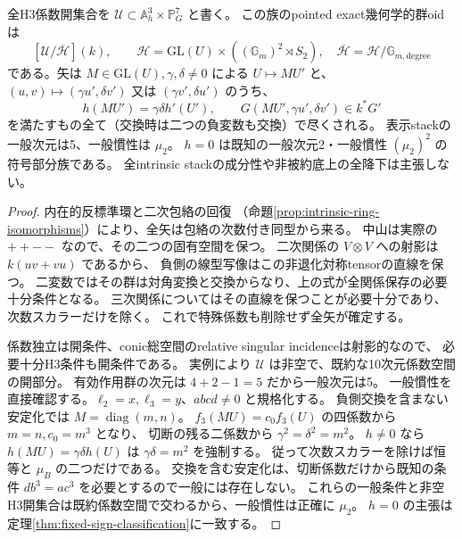 \begin{theorem}[曲がったClifford族の全幾何学的矢]
\label{thm:h3-order2-22-clifford-arrows}
全H3係数開集合を
$\mathcal U\subset\mathbb A^3_h\times\mathbb P^7_G$ と書く。
この族のpointed exact幾何学的群oidは
\[
 [\mathcal U/\overline{\mathcal H}](k),\qquad
 \mathcal H=\mathrm{GL}(U)\times((\mathbb G_m)^2\rtimes S_2),\quad
 \overline{\mathcal H}=\mathcal H/\mathbb G_{m,\mathrm{degree}}
\]
である。矢は $M\in\mathrm{GL}(U),\gamma,\delta\ne0$ による
$U\mapsto MU'$ と、
$(u,v)\mapsto(\gamma u',\delta v')$ 又は
$(\gamma v',\delta u')$ のうち、
\[
 h(MU')=\gamma\delta h'(U'),\qquad G(MU',\gamma u',\delta v')\in k^*G'
\]
を満たすもの全て（交換時は二つの負変数も交換）で尽くされる。
表示stackの一般次元は5、一般慣性は $\mu_2$。
$h=0$ は既知の一般次元2・一般慣性 $(\mu_2)^2$ の符号部分族である。
全intrinsic stackの成分性や非被約底上の全降下は主張しない。
\end{theorem}
\begin{proof}
内在的反標準環と二次包絡の回復
（命題\ref{prop:intrinsic-ring-isomorphisms}）により、全矢は包絡の次数付き同型から来る。
中山は実際の $++--$ なので、その二つの固有空間を保つ。
二次関係の $V\otimes V$ への射影は $k(uv+vu)$ であるから、
負側の線型写像はこの非退化対称tensorの直線を保つ。
二変数ではその群は対角変換と交換からなり、上の式が全関係保存の必要十分条件となる。
三次関係についてはその直線を保つことが必要十分であり、次数スカラーだけを除く。
これで特殊係数も削除せず全矢が確定する。

係数独立は開条件、conic総空間のrelative singular incidenceは射影的なので、
必要十分H3条件も開条件である。
実例により $\mathcal U$ は非空で、既約な10次元係数空間の開部分。
有効作用群の次元は $4+2-1=5$ だから一般次元は5。
一般慣性を直接確認する。$\ell_2=x,\ell_3=y$、$abcd\ne0$ と規格化する。
負側交換を含まない安定化では $M=\operatorname{diag}(m,n)$。
$f_3(MU)=c_0f_3(U)$ の四係数から $m=n,c_0=m^3$ となり、
切断の残る二係数から $\gamma^2=\delta^2=m^2$。
$h\ne0$ なら $h(MU)=\gamma\delta h(U)$ は $\gamma\delta=m^2$ を強制する。
従って次数スカラーを除けば恒等と $\mu_B$ の二つだけである。
交換を含む安定化は、切断係数だけから既知の条件 $db^3=ac^3$ を必要とするので一般には存在しない。
これらの一般条件と非空H3開集合は既約係数空間で交わるから、一般慣性は正確に $\mu_2$。
$h=0$ の主張は定理\ref{thm:fixed-sign-classification}に一致する。
\end{proof}
